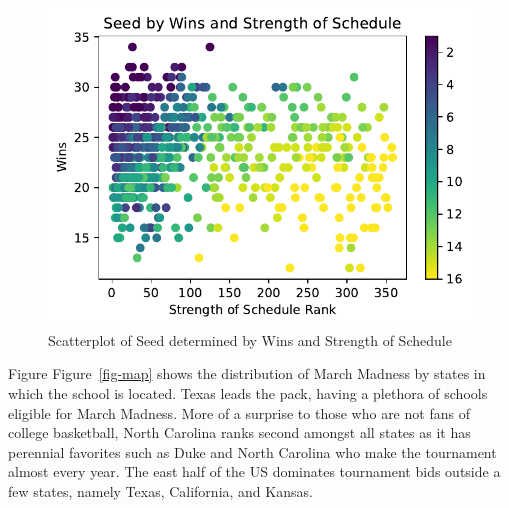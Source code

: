 \documentclass[
  letterpaper,
  DIV=11,
  numbers=noendperiod]{scrartcl}
\begin{document}
\begin{figure}[H]

{\centering \includegraphics{blog_files/figure-pdf/fig-seed-output-1.pdf}

}

\caption{\label{fig-seed}Scatterplot of Seed determined by Wins and
Strength of Schedule}

\end{figure}

Figure Figure~\ref{fig-map} shows the distribution of March Madness by
states in which the school is located. Texas leads the pack, having a
plethora of schools eligible for March Madness. More of a surprise to
those who are not fans of college basketball, North Carolina ranks
second amongst all states as it has perennial favorites such as Duke and
North Carolina who make the tournament almost every year. The east half
of the US dominates tournament bids outside a few states, namely Texas,
California, and Kansas.
\end{document}
